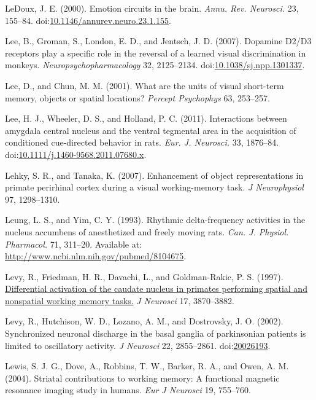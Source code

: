 \documentclass[
  11pt,
  a4paper,
]{scrbook}
\newlength{\cslhangindent}
\newenvironment{CSLReferences}[2] %
 {\begin{list}{}{%
  \setlength{\itemindent}{0pt}
  \setlength{\leftmargin}{0pt}
  \setlength{\parsep}{0pt}
  \ifodd #1
   \setlength{\leftmargin}{\cslhangindent}
   \setlength{\itemindent}{-1\cslhangindent}
  \fi
  \setlength{\itemsep}{#2\baselineskip}}}
 {\end{list}}
\begin{document}
\begin{CSLReferences}{1}{1}
LeDoux, J. E. (2000). {Emotion circuits in the brain.} \emph{Annu. Rev.
Neurosci.} 23, 155--84.
doi:\href{https://doi.org/10.1146/annurev.neuro.23.1.155}{10.1146/annurev.neuro.23.1.155}.

Lee, B., Groman, S., London, E. D., and Jentsch, J. D. (2007). Dopamine
D2/D3 receptors play a specific role in the reversal of a learned visual
discrimination in monkeys. \emph{Neuropsychopharmacology} 32,
2125--2134.
doi:\href{https://doi.org/10.1038/sj.npp.1301337}{10.1038/sj.npp.1301337}.

Lee, D., and Chun, M. M. (2001). What are the units of visual short-term
memory, objects or spatial locations? \emph{Percept Psychophys} 63,
253--257.

Lee, H. J., Wheeler, D. S., and Holland, P. C. (2011). {Interactions
between amygdala central nucleus and the ventral tegmental area in the
acquisition of conditioned cue-directed behavior in rats.} \emph{Eur. J.
Neurosci.} 33, 1876--84.
doi:\href{https://doi.org/10.1111/j.1460-9568.2011.07680.x}{10.1111/j.1460-9568.2011.07680.x}.

Lehky, S. R., and Tanaka, K. (2007). Enhancement of object
representations in primate perirhinal cortex during a visual
working-memory task. \emph{J Neurophysiol} 97, 1298--1310.

Leung, L. S., and Yim, C. Y. (1993). {Rhythmic delta-frequency
activities in the nucleus accumbens of anesthetized and freely moving
rats.} \emph{Can. J. Physiol. Pharmacol.} 71, 311--20. Available at:
\url{http://www.ncbi.nlm.nih.gov/pubmed/8104675}.

Levy, R., Friedman, H. R., Davachi, L., and Goldman-Rakic, P. S. (1997).
\href{https://www.ncbi.nlm.nih.gov/pubmed/9133405}{Differential
activation of the caudate nucleus in primates performing spatial and
nonspatial working memory tasks.} \emph{J Neurosci} 17, 3870--3882.

Levy, R., Hutchison, W. D., Lozano, A. M., and Dostrovsky, J. O. (2002).
Synchronized neuronal discharge in the basal ganglia of parkinsonian
patients is limited to oscillatory activity. \emph{J Neurosci} 22,
2855--2861. doi:\href{https://doi.org/20026193}{20026193}.

Lewis, S. J. G., Dove, A., Robbins, T. W., Barker, R. A., and Owen, A.
M. (2004). Striatal contributions to working memory: A functional
magnetic resonance imaging study in humans. \emph{Eur J Neurosci} 19,
755--760.


\end{CSLReferences}
\end{document}
